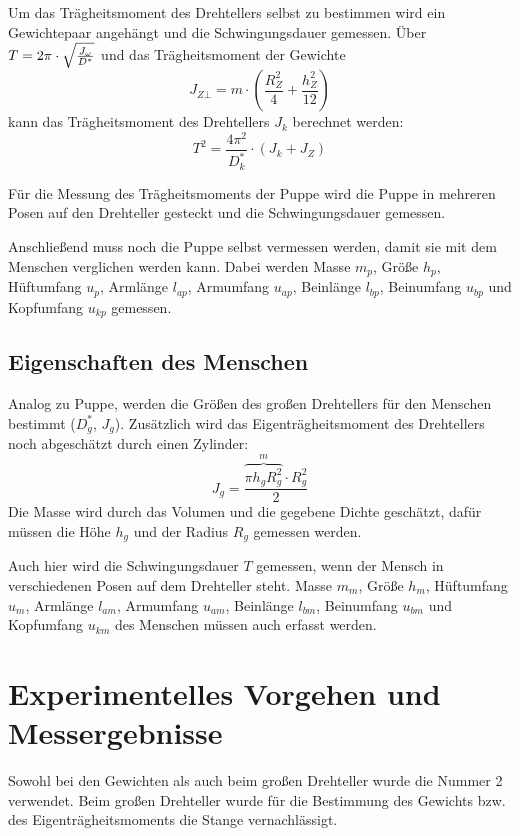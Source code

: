 \documentclass[a4paper,11pt]{article}
\begin{document}
Um das Trägheitsmoment des Drehtellers selbst zu bestimmen wird ein Gewichtepaar angehängt und die Schwingungsdauer gemessen. Über $T = 2\pi \cdot \sqrt{J_\omega \over D^*}$ und das Trägheitsmoment der Gewichte
\begin{equation}\label{equ:TraegheitsmomentZylinderBot}
J_{Z\bot} = m \cdot \left(\frac{R_Z^2}{4} + \frac{h_Z^2}{12}\right)
\end{equation}
kann das Trägheitsmoment des Drehtellers $J_k$ berechnet werden:
\begin{equation}\label{equ:Traegheitsmoment}
T^2 = \frac{4\pi^2}{D^*_k} \cdot (J_k + J_Z)
\end{equation}

Für die Messung des Trägheitsmoments der Puppe wird die Puppe in mehreren Posen auf den Drehteller gesteckt und die Schwingungsdauer gemessen.

Anschließend muss noch die Puppe selbst vermessen werden, damit sie mit dem Menschen verglichen werden kann. Dabei werden Masse $m_p$, Größe $h_p$, Hüftumfang $u_p$, Armlänge $l_{ap}$, Armumfang $u_{ap}$, Beinlänge $l_{bp}$, Beinumfang $u_{bp}$ und Kopfumfang $u_{kp}$ gemessen.

\subsection{Eigenschaften des Menschen}
Analog zu Puppe, werden die Größen des großen Drehtellers für den Menschen bestimmt ($D^*_g$, $J_g$). Zusätzlich wird das Eigenträgheitsmoment des Drehtellers noch abgeschätzt durch einen Zylinder:
\begin{equation}\label{equ:TraegheitsmomentZylinder}
J_g = \frac{\overbrace{\pi h_g R_g^2}^m \cdot  R_g^2}{2}
\end{equation}
Die Masse wird durch das Volumen und die gegebene Dichte geschätzt, dafür müssen die Höhe $h_g$ und der Radius $R_g$ gemessen werden.

Auch hier wird die Schwingungsdauer $T$ gemessen, wenn der Mensch in verschiedenen Posen auf dem Drehteller steht. Masse $m_m$, Größe $h_m$, Hüftumfang $u_m$, Armlänge $l_{am}$, Armumfang $u_{am}$, Beinlänge $l_{bm}$, Beinumfang $u_{bm}$ und Kopfumfang $u_{km}$ des Menschen müssen auch erfasst werden.

\section{Experimentelles Vorgehen und Messergebnisse}
Sowohl bei den Gewichten als auch beim großen Drehteller wurde die Nummer 2 verwendet. Beim großen Drehteller wurde für die Bestimmung des Gewichts bzw. des Eigenträgheitsmoments die Stange vernachlässigt.
\end{document}
